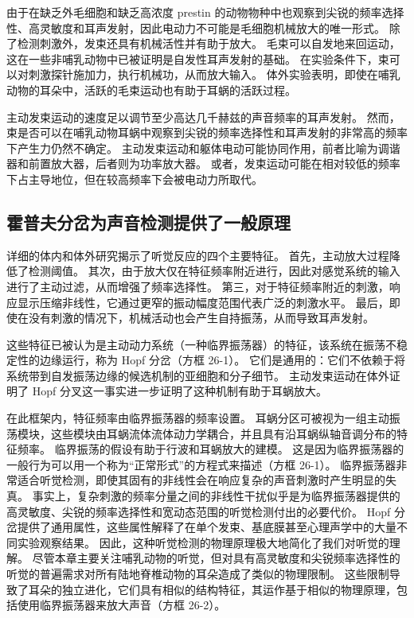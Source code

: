 由于在缺乏外毛细胞和缺乏高浓度 prestin 的动物物种中也观察到尖锐的频率选择性、高灵敏度和耳声发射，因此电动力不可能是毛细胞机械放大的唯一形式。 除了检测刺激外，发束还具有机械活性并有助于放大。 毛束可以自发地来回运动，这在一些非哺乳动物中已被证明是自发性耳声发射的基础。 在实验条件下，束可以对刺激探针施加力，执行机械功，从而放大输入。 体外实验表明，即使在哺乳动物的耳朵中，活跃的毛束运动也有助于耳蜗的活跃过程。

主动发束运动的速度足以调节至少高达几千赫兹的声音频率的耳声发射。 然而，束是否可以在哺乳动物耳蜗中观察到尖锐的频率选择性和耳声发射的非常高的频率下产生力仍然不确定。 主动发束运动和躯体电动可能协同作用，前者比喻为调谐器和前置放大器，后者则为功率放大器。 或者，发束运动可能在相对较低的频率下占主导地位，但在较高频率下会被电动力所取代。


\subsection{霍普夫分岔为声音检测提供了一般原理}
详细的体内和体外研究揭示了听觉反应的四个主要特征。 首先，主动放大过程降低了检测阈值。 其次，由于放大仅在特征频率附近进行，因此对感觉系统的输入进行了主动过滤，从而增强了频率选择性。 第三，对于特征频率附近的刺激，响应显示压缩非线性，它通过更窄的振动幅度范围代表广泛的刺激水平。 最后，即使在没有刺激的情况下，机械活动也会产生自持振荡，从而导致耳声发射。

这些特征已被认为是主动动力系统（一种临界振荡器）的特征，该系统在振荡不稳定性的边缘运行，称为 Hopf 分岔（方框 26-1）。 它们是通用的：它们不依赖于将系统带到自发振荡边缘的候选机制的亚细胞和分子细节。 主动发束运动在体外证明了 Hopf 分叉这一事实进一步证明了这种机制有助于耳蜗放大。

在此框架内，特征频率由临界振荡器的频率设置。 耳蜗分区可被视为一组主动振荡模块，这些模块由耳蜗流体流体动力学耦合，并且具有沿耳蜗纵轴音调分布的特征频率。 临界振荡的假设有助于行波和耳蜗放大的建模。 这是因为临界振荡器的一般行为可以用一个称为“正常形式”的方程式来描述（方框 26-1）。 临界振荡器非常适合听觉检测，即使其固有的非线性会在响应复杂的声音刺激时产生明显的失真。 事实上，复杂刺激的频率分量之间的非线性干扰似乎是为临界振荡器提供的高灵敏度、尖锐的频率选择性和宽动态范围的听觉检测付出的必要代价。 Hopf 分岔提供了通用属性，这些属性解释了在单个发束、基底膜甚至心理声学中的大量不同实验观察结果。 因此，这种听觉检测的物理原理极大地简化了我们对听觉的理解。 尽管本章主要关注哺乳动物的听觉，但对具有高灵敏度和尖锐频率选择性的听觉的普遍需求对所有陆地脊椎动物的耳朵造成了类似的物理限制。 这些限制导致了耳朵的独立进化，它们具有相似的结构特征，其运作基于相似的物理原理，包括使用临界振荡器来放大声音（方框 26-2）。


